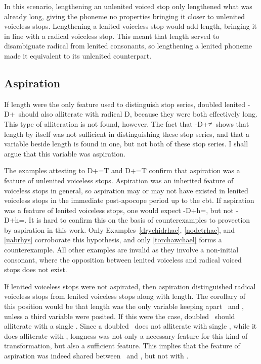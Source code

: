 In this scenario, lengthening an unlenited voiced stop only lengthened what was already long, giving the phoneme no properties bringing it closer to unlenited voiceless stops. Lengthening a lenited voiceless stop would add length, bringing it in line with a radical voiceless stop. This meant that length served to disambiguate radical from lenited consonants, so lengthening a lenited phoneme made it equivalent to its unlenited counterpart. 
\subsection{Aspiration}
If length were the only feature used to distinguish stop series, doubled lenited -\gls{D}+\lT\ should also alliterate with radical \gls{D}, because they were both effectively long. This type of alliteration is not found, however.  The fact that -\gls{D}+\lT≠\xD\ shows that length by itself was not sufficient in distinguishing these stop series, and that a variable beside length is found in one, but not both of these stop series. I shall argue that this variable was aspiration.

The examples attesting to \gls{D}+=\gls{T} and \gls{D}+=\gls{T} confirm that aspiration was a feature of unlenited voiceless stops. Aspiration was an inherited feature of voiceless stops in general, so aspiration may or may not have existed in lenited voiceless stops in the immediate post-apocope period up to the \gls{cbt}. If aspiration was a feature of lenited voiceless stops, one would expect -\gls{D}+h=\lT, but not -\gls{D}+h=\xD. It is hard to confirm this on the basis of counterexamples to provection by aspiration in this work. Only Examples~\ref{drychidrhac}, \ref{nodetrhac}, and \ref{uabrhys} corroborate this hypothesis, and only \ref{torchawchael} forms a counterexample. All other examples are invalid as they involve a non-initial consonant, where the opposition between lenited voiceless and radical voiced stops does not exist. 

If lenited voiceless stops were not aspirated, then aspiration distinguished radical voiceless stops from lenited voiceless stops along with length. The corollary of this position would be that length was the only variable keeping apart \lT\ and \xD, unless a third variable were posited. If this were the case, doubled \lT\ should alliterate with a single \xD. Since a doubled \lT\ does not alliterate with single \xD, while it does alliterate with \xT, longness was not only a necessary feature for this kind of transformation, but also a  sufficient feature. This implies that the feature of aspiration was indeed shared between \lT\ and \xT, but not with \xD.

